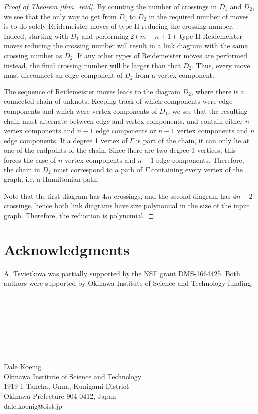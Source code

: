 \documentclass[12pt]{amsart}
\theoremstyle{definition}
\theoremstyle{remark}
\begin{document}
\begin{proof}[Proof of Theorem \ref{thm_reid}]
By counting the number of crossings in $D_1$ and $D_2$, we see that the only way to get from $D_1$ to $D_2$ in the required number of moves is to do solely Reidemeister moves of type II reducing the crossing number.
Indeed, starting with $D_1$ and performing $2(m-n+1)$ type II Reidemeister moves reducing the crossing number will result in a link diagram with the same crossing number as $D_2$.
If any other types of Reidemeister moves are performed instead, the final crossing number will be larger than that $D_2$.
Thus, every move must disconnect an edge component of $D_2$ from a vertex component.

The sequence of Reidemeister moves leads to the diagram $D_2$, where there is a connected chain of unknots.
Keeping track of which components were edge components and which were vertex components of $D_1$, we see that the resulting chain must alternate between edge and vertex components, and contain either $n$ vertex components and $n-1$ edge components or $n-1$ vertex components and $n$ edge components.
If a degree 1 vertex of $\Gamma$ is part of the chain, it can only lie at one of the endpoints of the chain.
Since there are two degree 1 vertices, this forces the case of $n$ vertex components and $n-1$ edge components.
Therefore, the chain in $D_2$  must correspond to a path of $\Gamma$ containing every vertex of the graph, i.e.
a Hamiltonian path.

Note that the first diagram has $4m$ crossings, and the second diagram has $4n-2$ crossings, hence both link diagrams have size polynomial in the size of the input graph.
Therefore, the reduction is polynomial.\end{proof}

\section{Acknowledgments}
A.
Tsvietkova was partially supported by the NSF grant DMS-1664425.
Both authors were supported by Okinawa Institute of Science and Technology funding.


\

\

\


{}

\

Dale Koenig \\
Okinawa Institute of Science and Technology\\
1919-1 Tancha, Onna, Kunigami District\\
Okinawa Prefecture 904-0412, Japan\\
dale.koenig@oist.jp
\end{document}

